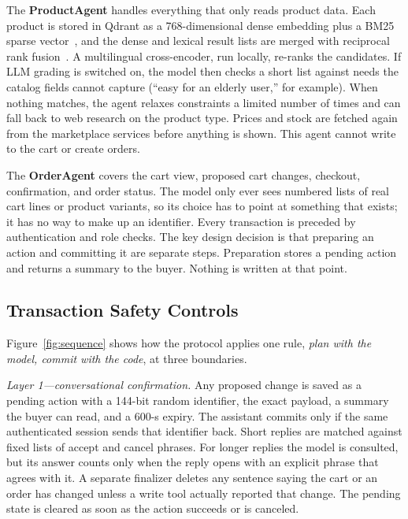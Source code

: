 \documentclass{IEEEtran}
\begin{document}
The \textbf{ProductAgent} handles everything that only reads product data. Each product is stored in Qdrant as a 768-dimensional dense embedding plus a BM25 sparse vector~\cite{qdrant,lee2025geminiembedding,robertson2009bm25}, and the dense and lexical result lists are merged with reciprocal rank fusion~\cite{cormack2009rrf}. A multilingual cross-encoder, run locally, re-ranks the candidates. If LLM grading is switched on, the model then checks a short list against needs the catalog fields cannot capture (``easy for an elderly user,'' for example). When nothing matches, the agent relaxes constraints a limited number of times and can fall back to web research on the product type. Prices and stock are fetched again from the marketplace services before anything is shown. This agent cannot write to the cart or create orders.

The \textbf{OrderAgent} covers the cart view, proposed cart changes, checkout, confirmation, and order status. The model only ever sees numbered lists of real cart lines or product variants, so its choice has to point at something that exists; it has no way to make up an identifier. Every transaction is preceded by authentication and role checks. The key design decision is that preparing an action and committing it are separate steps. Preparation stores a pending action and returns a summary to the buyer. Nothing is written at that point.

\subsection{Transaction Safety Controls}

Figure~\ref{fig:sequence} shows how the protocol applies one rule, \emph{plan with the model, commit with the code}, at three boundaries.

\textit{Layer 1---conversational confirmation.} Any proposed change is saved as a pending action with a 144-bit random identifier, the exact payload, a summary the buyer can read, and a 600-s expiry. The assistant commits only if the same authenticated session sends that identifier back. Short replies are matched against fixed lists of accept and cancel phrases. For longer replies the model is consulted, but its answer counts only when the reply opens with an explicit phrase that agrees with it. A separate finalizer deletes any sentence saying the cart or an order has changed unless a write tool actually reported that change. The pending state is cleared as soon as the action succeeds or is canceled.
\end{document}
